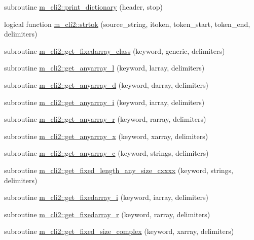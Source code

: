 \begin{DoxyCompactItemize}
subroutine \mbox{\hyperlink{namespacem__cli2_acbd726aa5c13b005a14c06d58915cb9a}{m\+\_\+cli2\+::print\+\_\+dictionary}} (header, stop)
\item 
logical function \mbox{\hyperlink{namespacem__cli2_a752fd074abce57e636e4572b3e55db3a}{m\+\_\+cli2\+::strtok}} (source\+\_\+string, itoken, token\+\_\+start, token\+\_\+end, delimiters)
\item 
subroutine \mbox{\hyperlink{namespacem__cli2_a6d8c1c441ac15f9a2882e50459d39565}{m\+\_\+cli2\+::get\+\_\+fixedarray\+\_\+class}} (keyword, generic, delimiters)
\item 
subroutine \mbox{\hyperlink{namespacem__cli2_a47cc758d20b655bc21672c31289e54ce}{m\+\_\+cli2\+::get\+\_\+anyarray\+\_\+l}} (keyword, larray, delimiters)
\item 
subroutine \mbox{\hyperlink{namespacem__cli2_aaede1f28172778cf45f4b6c04967bbbd}{m\+\_\+cli2\+::get\+\_\+anyarray\+\_\+d}} (keyword, darray, delimiters)
\item 
subroutine \mbox{\hyperlink{namespacem__cli2_ad314315dd5c93abff5168265f5ff0e4e}{m\+\_\+cli2\+::get\+\_\+anyarray\+\_\+i}} (keyword, iarray, delimiters)
\item 
subroutine \mbox{\hyperlink{namespacem__cli2_a8f1d5223b075f23d513c94548a1ebf09}{m\+\_\+cli2\+::get\+\_\+anyarray\+\_\+r}} (keyword, rarray, delimiters)
\item 
subroutine \mbox{\hyperlink{namespacem__cli2_ab9ab288fa5f108beeb7c94d81b223b7c}{m\+\_\+cli2\+::get\+\_\+anyarray\+\_\+x}} (keyword, xarray, delimiters)
\item 
subroutine \mbox{\hyperlink{namespacem__cli2_a448e8e24406f4bdbc14f26a940cbbc2c}{m\+\_\+cli2\+::get\+\_\+anyarray\+\_\+c}} (keyword, strings, delimiters)
\item 
subroutine \mbox{\hyperlink{namespacem__cli2_abc31389c45dcd95b8db641b59b98b447}{m\+\_\+cli2\+::get\+\_\+fixed\+\_\+length\+\_\+any\+\_\+size\+\_\+cxxxx}} (keyword, strings, delimiters)
\item 
subroutine \mbox{\hyperlink{namespacem__cli2_aa469ba94e6bb122c9bf30dd8642b693b}{m\+\_\+cli2\+::get\+\_\+fixedarray\+\_\+i}} (keyword, iarray, delimiters)
\item 
subroutine \mbox{\hyperlink{namespacem__cli2_afbec790abad0dca990c0a61cd2d9e9ae}{m\+\_\+cli2\+::get\+\_\+fixedarray\+\_\+r}} (keyword, rarray, delimiters)
\item 
subroutine \mbox{\hyperlink{namespacem__cli2_a32b78784e20e29bf40f17e16d08336fa}{m\+\_\+cli2\+::get\+\_\+fixed\+\_\+size\+\_\+complex}} (keyword, xarray, delimiters)

\end{DoxyCompactItemize}
